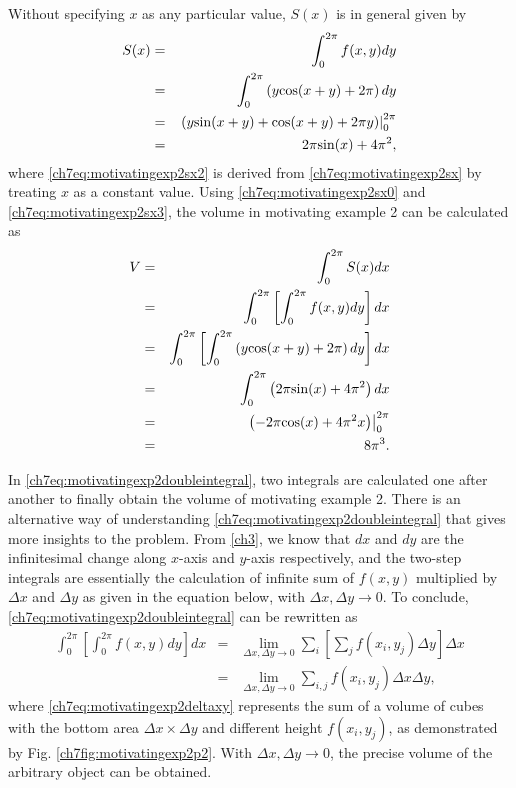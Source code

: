 Without specifying $x$ as any particular value, $S(x)$ is in general given by
\begin{eqnarray}
	S(x) &=& \int_{0}^{2\pi} f(x,y) dy \label{ch7eq:motivatingexp2sx0} \\ &=& \int_{0}^{2\pi}\left(y\textup{cos}(x+y)+2\pi\right)dy \label{ch7eq:motivatingexp2sx} \\
	&=& \left.\left(y\textup{sin}(x+y)+\textup{cos}(x+y) + 2\pi y\right)\right|_{0}^{2\pi} \label{ch7eq:motivatingexp2sx2} \\
	&=& 2\pi\textup{sin}(x) + 4\pi^2, \label{ch7eq:motivatingexp2sx3}
\end{eqnarray}
where \eqref{ch7eq:motivatingexp2sx2} is derived from \eqref{ch7eq:motivatingexp2sx} by treating $x$ as a constant value. Using  \eqref{ch7eq:motivatingexp2sx0} and \eqref{ch7eq:motivatingexp2sx3}, the volume in motivating example 2 can be calculated as
\begin{eqnarray}
	V &=& \int_{0}^{2\pi} S(x) dx \nonumber \\
	&=& \int_{0}^{2\pi} \left[\int_{0}^{2\pi}f(x,y)dy\right]dx \label{ch7eq:motivatingexp2doubleintegral} \\
	&=& \int_{0}^{2\pi} \left[ \int_{0}^{2\pi}\left(y\textup{cos}(x+y)+2\pi\right)dy\right] dx \nonumber \\
	&=& \int_{0}^{2\pi} \left(2\pi\textup{sin}(x) + 4\pi^2\right) dx \nonumber \\
	&=& \left.\left(-2\pi\textup{cos}(x) + 4\pi^2 x\right)\right|_{0}^{2\pi} \nonumber \\
	&=& 8\pi^3. \nonumber
\end{eqnarray}

In \eqref{ch7eq:motivatingexp2doubleintegral}, two integrals are calculated one after another to finally obtain the volume of motivating example 2. There is an alternative way of understanding \eqref{ch7eq:motivatingexp2doubleintegral} that gives more insights to the problem. From \ref{ch3}, we know that $dx$ and $dy$ are the infinitesimal change along $x$-axis and $y$-axis respectively, and the two-step integrals are essentially the calculation of infinite sum of $f(x,y)$ multiplied by $\Delta x$ and $\Delta y$ as given in the equation below, with $\Delta x, \Delta y \rightarrow 0$. To conclude, \eqref{ch7eq:motivatingexp2doubleintegral} can be rewritten as
\begin{eqnarray}
  \int_{0}^{2\pi} \left[\int_{0}^{2\pi}f(x,y)dy\right]dx &=& \lim_{\Delta x, \Delta y \rightarrow 0} \sum_{i} \left[\sum_{j} f(x_{i},y_{j}) \Delta y \right] \Delta x \nonumber \\
  &=& \lim_{\Delta x, \Delta y \rightarrow 0} \sum_{i,j} f(x_i,y_j) \Delta x \Delta y, \label{ch7eq:motivatingexp2deltaxy}
\end{eqnarray}
where \eqref{ch7eq:motivatingexp2deltaxy} represents the sum of a volume of cubes with the bottom area $\Delta x \times \Delta y$ and different height $f(x_i,y_j)$, as demonstrated by Fig. \ref{ch7fig:motivatingexp2p2}. With $\Delta x, \Delta y \rightarrow 0$, the precise volume of the arbitrary object can be obtained.


